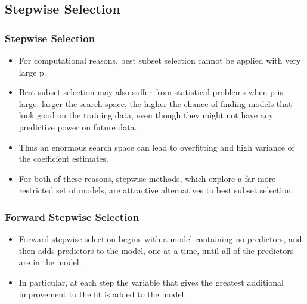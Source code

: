\documentclass[
  shownotes,
  xcolor={svgnames},
  hyperref={colorlinks,citecolor=DarkBlue,linkcolor=DarkRed,urlcolor=DarkBlue}
  ]{beamer}
\begin{document}
\subsection{Stepwise Selection}
\begin{frame}[fragile]
\frametitle{Stepwise Selection}
 
 \begin{itemize}
\item For computational reasons, best subset selection cannot be applied with very large p. 
\medskip
\item Best subset selection may also suffer from statistical problems when p is large: larger the search space, the higher the chance of finding models that look good on the training data, even though they might not have any predictive power on future data.
\medskip
\item Thus an enormous search space can lead to overfitting and high variance of the coefficient estimates.
\medskip
\item For both of these reasons, stepwise methods, which explore a far more restricted set of models, are attractive alternatives to best subset selection.
\end{itemize}

\end{frame}
\begin{frame}[fragile]
\frametitle{Forward Stepwise Selection}

 \begin{itemize}
\item  Forward stepwise selection begins with a model containing no predictors, and then adds predictors to the model, one-at-a-time, until all of the predictors are in the model.
\bigskip
\item   In particular, at each step the variable that gives the greatest additional improvement to the fit is added to the model.
\end{itemize}

\end{frame}
\end{document}
